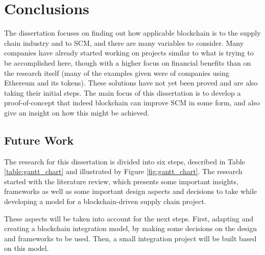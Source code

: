 \chapter{Conclusions}
\label{chap:conclusions}

\minitoc \mtcskip \noindent

The dissertation focuses on finding out how applicable blockchain is to the supply chain industry and to SCM, and there are many variables to consider. Many companies have already started working on projects similar to what is trying to be accomplished here, though with a higher focus on financial benefits than on the research itself (many of the examples given were of companies using Ethereum and its tokens). These solutions have not yet been proved and are also taking their initial steps. The main focus of this dissertation is to develop a proof-of-concept that indeed blockchain can improve SCM in some form, and also give an insight on how this might be achieved. 

\section{Future Work}

The research for this dissertation is divided into six steps, described in Table \ref{table:gantt_chart} and illustrated by Figure \ref{fig:gantt_chart}. The research started with the literature review, which presents some important insights, frameworks as well as some important design aspects and decisions to take while developing a model for a blockchain-driven supply chain project.

These aspects will be taken into account for the next steps. First, adapting and creating a blockchain integration model, by making some decisions on the design and frameworks to be used. Then, a small integration project will be built based on this model.

